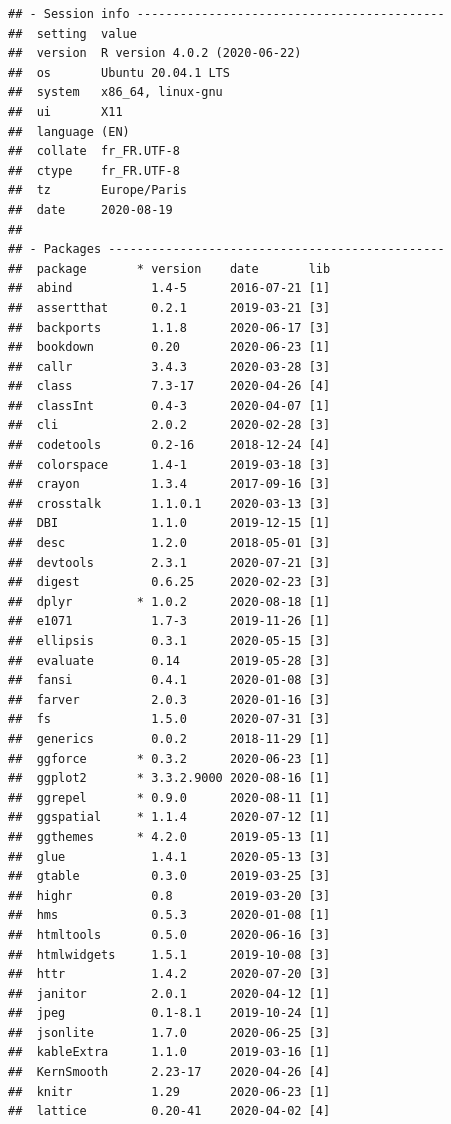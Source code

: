 \documentclass[
  french,
]{book}
\begin{document}
\begin{verbatim}
## - Session info -------------------------------------------
##  setting  value                       
##  version  R version 4.0.2 (2020-06-22)
##  os       Ubuntu 20.04.1 LTS          
##  system   x86_64, linux-gnu           
##  ui       X11                         
##  language (EN)                        
##  collate  fr_FR.UTF-8                 
##  ctype    fr_FR.UTF-8                 
##  tz       Europe/Paris                
##  date     2020-08-19                  
## 
## - Packages -----------------------------------------------
##  package       * version    date       lib
##  abind           1.4-5      2016-07-21 [1]
##  assertthat      0.2.1      2019-03-21 [3]
##  backports       1.1.8      2020-06-17 [3]
##  bookdown        0.20       2020-06-23 [1]
##  callr           3.4.3      2020-03-28 [3]
##  class           7.3-17     2020-04-26 [4]
##  classInt        0.4-3      2020-04-07 [1]
##  cli             2.0.2      2020-02-28 [3]
##  codetools       0.2-16     2018-12-24 [4]
##  colorspace      1.4-1      2019-03-18 [3]
##  crayon          1.3.4      2017-09-16 [3]
##  crosstalk       1.1.0.1    2020-03-13 [3]
##  DBI             1.1.0      2019-12-15 [1]
##  desc            1.2.0      2018-05-01 [3]
##  devtools        2.3.1      2020-07-21 [3]
##  digest          0.6.25     2020-02-23 [3]
##  dplyr         * 1.0.2      2020-08-18 [1]
##  e1071           1.7-3      2019-11-26 [1]
##  ellipsis        0.3.1      2020-05-15 [3]
##  evaluate        0.14       2019-05-28 [3]
##  fansi           0.4.1      2020-01-08 [3]
##  farver          2.0.3      2020-01-16 [3]
##  fs              1.5.0      2020-07-31 [3]
##  generics        0.0.2      2018-11-29 [1]
##  ggforce       * 0.3.2      2020-06-23 [1]
##  ggplot2       * 3.3.2.9000 2020-08-16 [1]
##  ggrepel       * 0.9.0      2020-08-11 [1]
##  ggspatial     * 1.1.4      2020-07-12 [1]
##  ggthemes      * 4.2.0      2019-05-13 [1]
##  glue            1.4.1      2020-05-13 [3]
##  gtable          0.3.0      2019-03-25 [3]
##  highr           0.8        2019-03-20 [3]
##  hms             0.5.3      2020-01-08 [1]
##  htmltools       0.5.0      2020-06-16 [3]
##  htmlwidgets     1.5.1      2019-10-08 [3]
##  httr            1.4.2      2020-07-20 [3]
##  janitor         2.0.1      2020-04-12 [1]
##  jpeg            0.1-8.1    2019-10-24 [1]
##  jsonlite        1.7.0      2020-06-25 [3]
##  kableExtra      1.1.0      2019-03-16 [1]
##  KernSmooth      2.23-17    2020-04-26 [4]
##  knitr           1.29       2020-06-23 [1]
##  lattice         0.20-41    2020-04-02 [4]

\end{verbatim}
\end{document}
